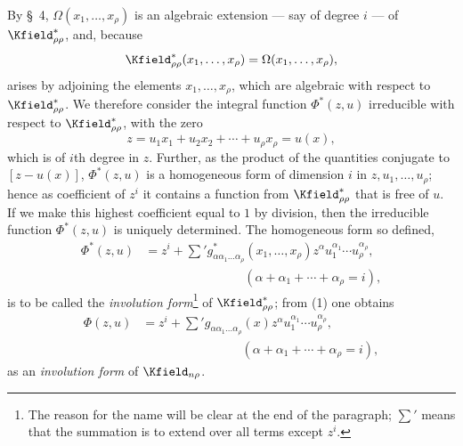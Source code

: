\documentclass[11pt]{article}
\begin{document}
By \S\ 4, $\Omega(x_1,
\ldots,x_\rho)$ is an algebraic extension --- say of degree $i$ --- of $\Kfield^*_{\rho\rho}$, and, because
\[
  \Kfield^*_{\rho\rho}(x_1,
  \ldots,x_\rho)=\Omega(x_1,
  \ldots,x_\rho),
\]
arises by adjoining the elements $x_1,
\ldots,x_\rho$, which are algebraic with respect to $\Kfield^*_{\rho\rho}$. We therefore consider the integral function $\Phi^*(z,u)$ irreducible with respect to $\Kfield^*_{\rho\rho}$, with the zero
\[
  z=u_1x_1+u_2x_2+\cdots+u_\rho x_\rho=u(x),
\]
which is of $i$th degree in $z$. Further, as the product of the quantities conjugate to $[z-u(x)]$, $\Phi^*(z,u)$ is a homogeneous form of dimension $i$ in $z,u_1,
\ldots,u_\rho$; hence as coefficient of $z^i$ it contains a function from $\Kfield^*_{\rho\rho}$ that is free of $u$. If we make this highest coefficient equal to $1$ by division, then the irreducible function $\Phi^*(z,u)$ is uniquely determined. The homogeneous form so defined,
\begin{equation}
\begin{aligned}
  \Phi^*(z,u)
  &=z^i+
    \sum{}' g^*_{\alpha\alpha_1\ldots\alpha_\rho}(x_1,
    \ldots,x_\rho)
    z^\alpha u_1^{\alpha_1}\cdots u_\rho^{\alpha_\rho},\\
  &\hspace{8em}(\alpha+\alpha_1+\cdots+\alpha_\rho=i),
\end{aligned}
\tag{1}
\end{equation}
is to be called the \emph{involution form}\footnote{The reason for the name will be clear at the end of the paragraph; $\sum'$ means that the summation is to extend over all terms except $z^i$.} of $\Kfield^*_{\rho\rho}$; from (1) one obtains
\begin{equation}
\begin{aligned}
  \Phi(z,u)
  &=z^i+
    \sum{}' g_{\alpha\alpha_1\ldots\alpha_\rho}(x)
    z^\alpha u_1^{\alpha_1}\cdots u_\rho^{\alpha_\rho},\\
  &\hspace{8em}(\alpha+\alpha_1+\cdots+\alpha_\rho=i),
\end{aligned}
\tag{2}
\end{equation}
as an \emph{involution form} of $\Kfield_{n\rho}$.
\end{document}
